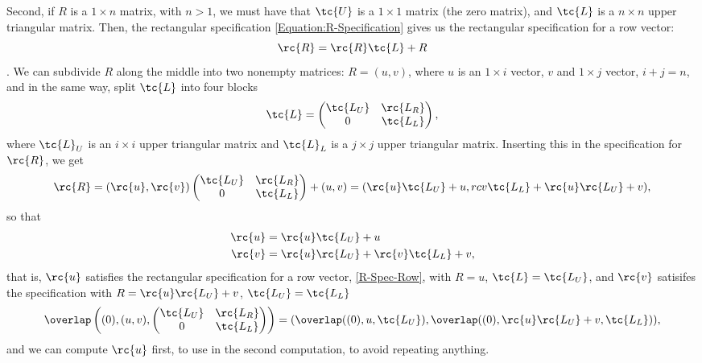 Second, if $R$ is a $1 \times n$ matrix, with $n > 1$, we must have that $\tc{U}$ is a $1 \times 1$ matrix (the zero matrix), and $\tc{L}$ is a $n \times n$ upper triangular matrix. Then, the rectangular specification  \eqref{Equation:R-Specification} gives us the rectangular specification for a row vector:
\begin{equation}
  \label{R-Spec-Row}
  \rc{R} = \rc{R}\tc{L} + R
\end{equation}
. We can subdivide $R$ along the middle into two nonempty matrices: $R = (u , v)$, where $u$ is an $1 \times i$ vector, $v$ and $1 \times j$ vector, $i + j = n$, and in the same way, split $\tc{L}$ into four blocks 
\begin{equation*}
  \tc{L} = 
  \begin{pmatrix}
    \tc{L_U} & \rc{L_R} \\
    0   & \tc{L_L}
  \end{pmatrix},
\end{equation*}
where $\tc{L}_U$ is an $i \times i$ upper triangular matrix and $\tc{L}_L$ is a $j \times j$ upper triangular matrix. Inserting this in the specification for $\rc{R}$, we get
\begin{equation*}
  \rc{R} = (\rc{u} , \rc{v}) 
  \begin{pmatrix}
    \tc{L_U} & \rc{L_R} \\
    0   & \tc{L_L}
  \end{pmatrix}
  + (u , v) 
  = 
  (\rc{u}\tc{L_U} + u , rc{v}\tc{L_L} + \rc{u}\rc{L_U} + v ),
\end{equation*}
so that 
\begin{align*}
  \rc{u} &= \rc{u}\tc{L_U} + u\\
  \rc{v} &= \rc{u}\rc{L_U}  + \rc{v}\tc{L_L} + v,
\end{align*}
that is, $\rc{u}$ satisfies the rectangular specification for a row vector, \eqref{R-Spec-Row}, with $R = u$, $\tc{L} = \tc{L_U}$, and $\rc{v}$ satisifes the specification with $R = \rc{u}\rc{L_U} + v  $, $\tc{L_U} = \tc{L_L}$
\begin{equation}
  \label{overlap2}
  \overlap\left((0), (u , v) ,
  \begin{pmatrix}
    \tc{L_U} & \rc{L_R} \\
    0   & \tc{L_L}
  \end{pmatrix} \right) 
  = (\overlap((0) , u ,\tc{L_U} ) , \overlap((0) , \rc{u}\rc{L_U} + v , \tc{L_L} ) ),
\end{equation}
and we can compute $\rc{u}$ first, to use in the second computation, to avoid repeating anything.

